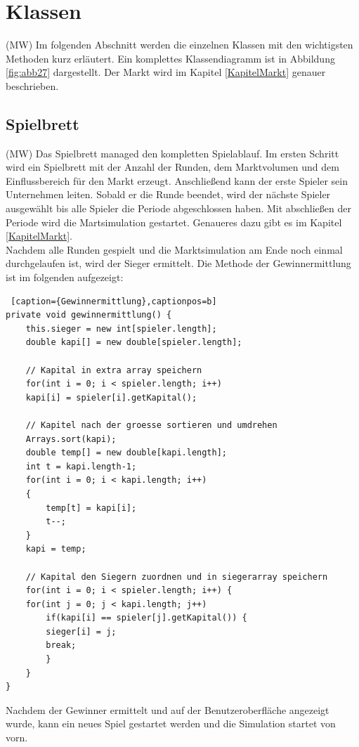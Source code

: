 \newpage
\section{Klassen}
(MW) Im folgenden Abschnitt werden die einzelnen Klassen mit den wichtigsten Methoden kurz erläutert. Ein komplettes Klassendiagramm ist in Abbildung \ref{fig:abb27} dargestellt. Der Markt wird im Kapitel \ref{KapitelMarkt} genauer beschrieben.

\subsection{Spielbrett}
(MW) Das Spielbrett managed den kompletten Spielablauf. Im ersten Schritt wird ein Spielbrett mit der Anzahl der Runden, dem Marktvolumen und dem Einflussbereich für den Markt erzeugt. Anschließend kann der erste Spieler sein Unternehmen leiten. Sobald er die Runde beendet, wird der nächste Spieler ausgewählt bis alle Spieler die Periode abgeschlossen haben. Mit abschließen der Periode wird die Martsimulation gestartet. Genaueres dazu gibt es im Kapitel \ref{KapitelMarkt}. \\
Nachdem alle Runden gespielt und die Marktsimulation am Ende noch einmal durchgelaufen ist, wird der Sieger ermittelt. Die Methode der Gewinnermittlung ist im folgenden aufgezeigt: \\

\lstset{language=Java} 
\begin{lstlisting} [caption={Gewinnermittlung},captionpos=b]
private void gewinnermittlung() {
	this.sieger = new int[spieler.length];
	double kapi[] = new double[spieler.length];
	
	// Kapital in extra array speichern
	for(int i = 0; i < spieler.length; i++)
	kapi[i] = spieler[i].getKapital();
	
	// Kapitel nach der groesse sortieren und umdrehen		
	Arrays.sort(kapi);
	double temp[] = new double[kapi.length];
	int t = kapi.length-1;
	for(int i = 0; i < kapi.length; i++)
	{
		temp[t] = kapi[i];
		t--;
	}
	kapi = temp;
	
	// Kapital den Siegern zuordnen und in siegerarray speichern
	for(int i = 0; i < spieler.length; i++) {
	for(int j = 0; j < kapi.length; j++)
		if(kapi[i] == spieler[j].getKapital()) {
		sieger[i] = j;
		break;
		}
	}
}
\end{lstlisting}

Nachdem der Gewinner ermittelt und auf der Benutzeroberfläche angezeigt wurde, kann ein neues Spiel gestartet werden und die Simulation startet von vorn.

